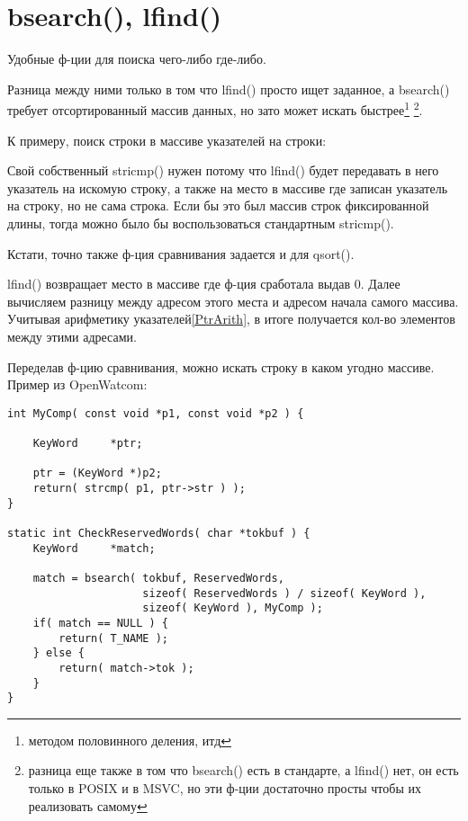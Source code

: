 ﻿\section{bsearch(), lfind()}

Удобные ф-ции для поиска чего-либо где-либо. 

Разница между ними только в том что lfind() просто ищет заданное, а bsearch() требует отсортированный массив
данных, но зато может искать быстрее\footnote{методом половинного деления, итд}
\footnote{разница еще также в том что bsearch() есть в стандарте\cite{C99TC3}, 
а lfind() нет, он есть только в POSIX и в MSVC, но эти ф-ции достаточно просты чтобы их реализовать самому}.

К примеру, поиск строки в массиве указателей на строки:



Свой собственный stricmp() нужен потому что lfind() будет передавать в него указатель на искомую строку,
а также на место в массиве где записан указатель на строку, но не сама строка. Если бы это был
массив строк фиксированной длины, тогда можно было бы воспользоваться стандартным stricmp().

Кстати, точно также ф-ция сравнивания задается и для qsort().

lfind() возвращает место в массиве где ф-ция  сработала выдав 0. Далее вычисляем разницу
между адресом этого места и адресом начала самого массива. Учитывая арифметику указателей\ref{PtrArith}, 
в итоге получается кол-во элементов между этими адресами.

Переделав ф-цию сравнивания, можно искать строку в каком угодно массиве.
Пример из OpenWatcom:

\begin{lstlisting}[caption=\textbackslash{}bld\textbackslash{}pbide\textbackslash{}defgen\textbackslash{}scan.c]
int MyComp( const void *p1, const void *p2 ) {

    KeyWord     *ptr;

    ptr = (KeyWord *)p2;
    return( strcmp( p1, ptr->str ) );
}

static int CheckReservedWords( char *tokbuf ) {
    KeyWord     *match;

    match = bsearch( tokbuf, ReservedWords,
                     sizeof( ReservedWords ) / sizeof( KeyWord ),
                     sizeof( KeyWord ), MyComp );
    if( match == NULL ) {
        return( T_NAME );
    } else {
        return( match->tok );
    }
}
\end{lstlisting}

